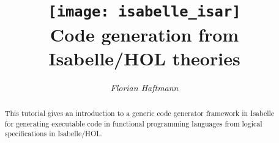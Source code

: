 \documentclass[12pt,a4paper,fleqn]{report}
\title{\texttt{[image: isabelle\_isar]}
  \\[4ex] Code generation from Isabelle/HOL theories}
\author{\emph{Florian Haftmann}}
\begin{document}
\maketitle

\begin{abstract}
  This tutorial gives an introduction to a generic code generator framework in Isabelle
  for generating executable code in functional programming languages from logical
  specifications in Isabelle/HOL.
\end{abstract}

\thispagestyle{empty}\clearpage

\clearfirst







\begingroup
 \small\raggedright\frenchspacing

\endgroup
\end{document}
